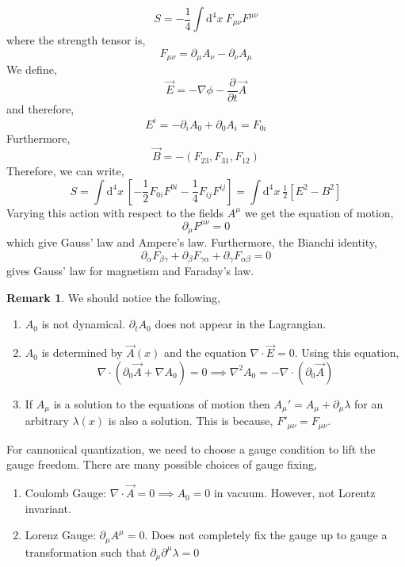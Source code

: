 \documentclass[12pt]{extarticle}
\newcommand{\dn}[2]{\! \mathrm{d}^{#1} #2 \:}
\newcommand{\pderiv}[2]{\frac{\partial{#1}}{\partial{#2}}}
\theoremstyle{definition}
\newtheorem{remark}[theorem]{Remark}
\begin{document}
\[ S = - \frac{1}{4} \int \dn{4}{x} F_{\mu \nu} F^{\mu \nu} \]
where the strength tensor is,
\[ F_{\mu \nu} = \partial_\mu A_\nu - \partial_\nu A_\mu \]
We define,
\[ \vec{E} = - \nabla \phi - \pderiv{}{t} \vec{A} \]
and therefore,
\[ E^i = - \partial_i A_0 + \partial_0 A_i = F_{0 i} \]
Furthermore,
\[ \vec{B} = - (F_{23}, F_{31}, F_{12}) \]
Therefore, we can write,
\[ S = \int \dn{4}{x} \left[ - \frac{1}{2} F_{0i} F^{0i} - \frac{1}{4} F_{ij} F^{ij} \right] = \int \dn{4}{x} \tfrac{1}{2} \left[E^2 - B^2 \right] \]
Varying this action with respect to the fields $A^\mu$ we get the equation of motion,
\[ \partial_\mu F^{\mu \nu} = 0 \]
which give Gauss' law and Ampere's law. Furthermore, the Bianchi identity,
\[ \partial_\alpha F_{\beta \gamma} + \partial_\beta F_{\gamma \alpha} + \partial_{\gamma} F_{\alpha \beta} = 0 \]
gives Gauss' law for magnetism and Faraday's law. 

\begin{remark}
We should notice the following,
\begin{enumerate}
\item $A_0$ is not dynamical. $\partial_t A_0$ does not appear in the Lagrangian.

\item $A_0$ is determined by $\vec{A}(x)$ and the equation $\nabla \cdot \vec{E} = 0$. Using this equation,
\[ \nabla \cdot (\partial_0 \vec{A} + \nabla A_0) = 0 \implies \nabla^2 A_0 = - \nabla \cdot (\partial_0 \vec{A}) \] 

\item If $A_\mu$ is a solution to the equations of motion then $A_\mu' = A_\mu + \partial_\mu \lambda$ for an arbitrary $\lambda(x)$ is also a solution. This is because, $F'_{\mu \nu} = F_{\mu \nu}$.  
\end{enumerate}
\end{remark}

For cannonical quantization, we need to choose a gauge condition to lift the gauge freedom. There are many possible choices of gauge fixing,
\begin{enumerate}
\item Coulomb Gauge: $\nabla \cdot \vec{A} = 0 \implies A_0 = 0$ in vacuum. However, not Lorentz invariant.

\item Lorenz Gauge: $\partial_\mu A^\mu = 0$. Does not completely fix the gauge up to gauge a transformation such that $\partial_\mu \partial^\mu \lambda = 0$ 
\end{enumerate}
\end{document}
